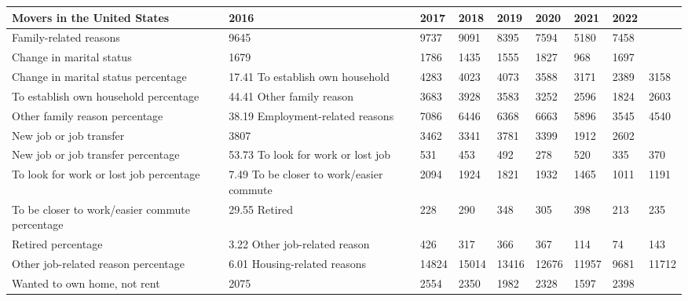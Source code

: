 \begin{tabular}{llllllll}
\toprule
Movers in the United States & 2016 & 2017 & 2018 & 2019 & 2020 & 2021 & 2022 \\
\midrule
Family-related reasons & 9645 & 9737 & 9091 & 8395 & 7594 & 5180 & 7458 \\
Change in marital status & 1679 & 1786 & 1435 & 1555 & 1827 & 968 & 1697 \\
Change in marital status percentage & 17.41%
To establish own household & 4283 & 4023 & 4073 & 3588 & 3171 & 2389 & 3158 \\
To establish own household percentage & 44.41%
Other family reason & 3683 & 3928 & 3583 & 3252 & 2596 & 1824 & 2603 \\
Other family reason percentage & 38.19%
Employment-related reasons & 7086 & 6446 & 6368 & 6663 & 5896 & 3545 & 4540 \\
New job or job transfer & 3807 & 3462 & 3341 & 3781 & 3399 & 1912 & 2602 \\
New job or job transfer percentage & 53.73%
To look for work or lost job & 531 & 453 & 492 & 278 & 520 & 335 & 370 \\
To look for work or lost job percentage & 7.49%
To be closer to work/easier commute & 2094 & 1924 & 1821 & 1932 & 1465 & 1011 & 1191 \\
To be closer to work/easier commute percentage & 29.55%
Retired & 228 & 290 & 348 & 305 & 398 & 213 & 235 \\
Retired percentage & 3.22%
Other job-related reason & 426 & 317 & 366 & 367 & 114 & 74 & 143 \\
Other job-related reason percentage & 6.01%
Housing-related reasons & 14824 & 15014 & 13416 & 12676 & 11957 & 9681 & 11712 \\
Wanted to own home, not rent & 2075 & 2554 & 2350 & 1982 & 2328 & 1597 & 2398 \\

\end{tabular}
